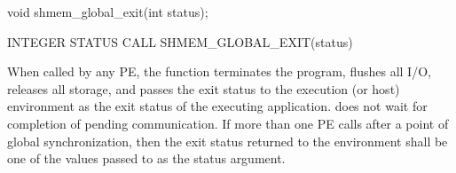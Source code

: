\synC
void shmem_global_exit(int status); %

\synF
INTEGER STATUS
CALL SHMEM_GLOBAL_EXIT(status) %


{
       When called by any  \ac{PE}, the   function terminates the 
       \openshmem program, \color{red} flushes all I/O, releases all storage, \color{black}and passes the 
       exit status to the execution (or host) environment as the exit status of the executing application. 
         does not wait for completion of pending communication. 
       If more than one \ac{PE} calls   after a point of global 
       synchronization, then the exit status returned to the environment shall be one of the 
       values passed to  as the status argument.
}
{
}
\eAPI
